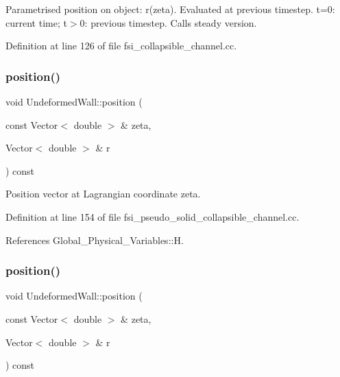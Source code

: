 Parametrised position on object\+: r(zeta). Evaluated at previous timestep. t=0\+: current time; t$>$0\+: previous timestep. Calls steady version. 



Definition at line 126 of file fsi\+\_\+collapsible\+\_\+channel.\+cc.

\mbox{\label{classUndeformedWall_ab0410681e2096091319a79e79937cba3}} 
\subsubsection{\texorpdfstring{position()}{position()}\hspace{0.1cm}{\footnotesize\ttfamily [5/8]}}
{\footnotesize\ttfamily void Undeformed\+Wall\+::position (\begin{DoxyParamCaption}\item[{const Vector$<$ double $>$ \&}]{zeta,  }\item[{Vector$<$ double $>$ \&}]{r }\end{DoxyParamCaption}) const\hspace{0.3cm}{\ttfamily [inline]}}



Position vector at Lagrangian coordinate zeta. 



Definition at line 154 of file fsi\+\_\+pseudo\+\_\+solid\+\_\+collapsible\+\_\+channel.\+cc.



References Global\+\_\+\+Physical\+\_\+\+Variables\+::H.

\mbox{\label{classUndeformedWall_ab0410681e2096091319a79e79937cba3}} 
\subsubsection{\texorpdfstring{position()}{position()}\hspace{0.1cm}{\footnotesize\ttfamily [6/8]}}
{\footnotesize\ttfamily void Undeformed\+Wall\+::position (\begin{DoxyParamCaption}\item[{const Vector$<$ double $>$ \&}]{zeta,  }\item[{Vector$<$ double $>$ \&}]{r }\end{DoxyParamCaption}) const\hspace{0.3cm}{\ttfamily [inline]}}



